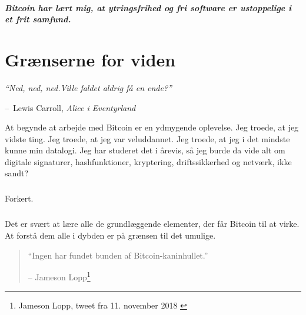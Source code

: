 \documentclass[paper=6in:9in,pagesize=pdftex,
               headinclude=on,footinclude=on,12pt]{scrbook}
\makeatletter
\newenvironment{chapquote}[2][4em]{\setlength{\@tempdima}{#1}%
   \def\chapquote@author{#2}%
   \parshape 1 \@tempdima \dimexpr\textwidth-2\@tempdima\relax%
   \itshape}{\par\normalfont\hfill--\ \chapquote@author\hspace*{\@tempdima}\par\bigskip}
\makeatother
\begin{document}
\paragraph{Bitcoin har lært mig, at ytringsfrihed og fri software er ustoppelige i et frit samfund.}%
%
%
%
%
%
%
%

\chapter{Grænserne for viden}
\label{les:7}

\begin{chapquote}{Lewis Carroll, \textit{Alice i Eventyrland}} \enquote{Ned, ned, ned.\newline Ville faldet aldrig få en ende?} \end{chapquote}

At begynde at arbejde med Bitcoin er en ydmygende oplevelse. Jeg troede, at jeg vidste ting. Jeg troede, at jeg var veluddannet. Jeg troede, at jeg i det mindste kunne min datalogi. Jeg har studeret det i årevis, så jeg burde da vide alt om digitale signaturer, hashfunktioner, kryptering, driftssikkerhed og netværk, ikke sandt?\paragraph{} Forkert.\paragraph{} Det er svært at lære alle de grundlæggende elementer, der får Bitcoin til at virke. At forstå dem alle i dybden er på grænsen til det umulige.\begin{quotation}\begin{samepage} \enquote{Ingen har fundet bunden af Bitcoin-kaninhullet.} \begin{flushright} -- Jameson Lopp\footnote{Jameson Lopp, tweet fra 11. november 2018 \cite{lopp-tweet}}
\end{flushright}\end{samepage}\end{quotation}
\end{document}
